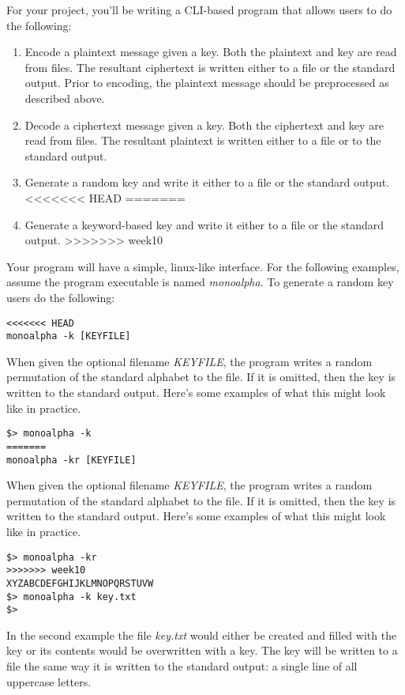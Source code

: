 \documentclass[]{tufte-handout}
\begin{document}
For your project, you'll be writing a CLI-based program that allows users to do the following:
\begin{enumerate}
\item Encode a plaintext message given a key. Both the plaintext and key are read from files. The resultant ciphertext is written either to a file or the standard output. Prior to encoding, the plaintext message should be preprocessed as described above.
\item Decode a ciphertext message given a key. Both the ciphertext and key are read from files. The resultant plaintext is written either to a file or to the standard output.
\item Generate a random key and write it either to a file or the standard output.  
<<<<<<< HEAD
=======
\item Generate a keyword-based key and write it either to a file or the standard output.
>>>>>>> week10
\end{enumerate}

Your program will have a simple, linux-like interface. For the following examples, assume the program executable is named \textit{monoalpha}. To generate a random key users do the following:
\begin{verbatim}
<<<<<<< HEAD
monoalpha -k [KEYFILE]
\end{verbatim}  
When given the optional filename \textit{KEYFILE}, the program writes a random permutation of the standard alphabet to the file. If it is omitted, then the key is written to the standard output. Here's some examples of what this might look like in practice.
\begin{verbatim}
$> monoalpha -k
=======
monoalpha -kr [KEYFILE]
\end{verbatim}  
When given the optional filename \textit{KEYFILE}, the program writes a random permutation of the standard alphabet to the file. If it is omitted, then the key is written to the standard output. Here's some examples of what this might look like in practice.
\begin{verbatim}
$> monoalpha -kr
>>>>>>> week10
XYZABCDEFGHIJKLMNOPQRSTUVW
$> monoalpha -k key.txt
$>
\end{verbatim}
In the second example the file \textit{key.txt} would either be created and filled with the key or its contents would be overwritten with a key. The key will be written to a file the same way it is written to the standard output: a single line of all uppercase letters.
\end{document}
